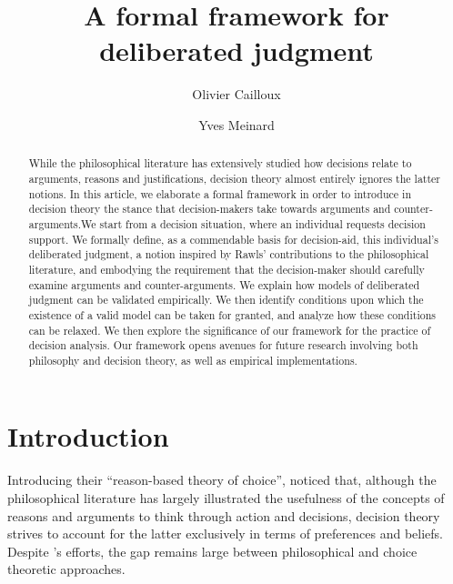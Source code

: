 \documentclass[smallextended,nospthms, natbib]{svjour3}
\begin{document}
\title{A formal framework for deliberated judgment}
\author{Olivier Cailloux \and Yves Meinard}
\makeatletter
\makeatother
\maketitle


\begin{abstract}
While the philosophical literature has extensively studied how decisions relate to arguments, reasons and justifications, decision theory almost entirely ignores the latter notions.
In this article, we elaborate a formal framework in order to introduce in decision theory the stance that decision-makers take towards arguments and counter-arguments.We start from a decision situation, where an individual requests decision support. We formally define, as a commendable basis for decision-aid, this individual’s deliberated judgment, a notion inspired by Rawls' contributions to the philosophical literature, and embodying the requirement that the decision-maker should carefully examine arguments and counter-arguments.  
We explain how models of deliberated judgment can be validated empirically.
We then identify conditions upon which the existence of a valid model can be taken for granted, and analyze how these conditions can be relaxed.
We then explore the significance of our framework for the practice of decision analysis.
Our framework opens avenues for future research involving both philosophy and decision theory, as well as empirical implementations. 
\end{abstract}

\section{Introduction}
\label{sec:intro}

Introducing their “reason-based theory of choice”, \citet{dietrich_reason-based_2013} noticed that, although the philosophical literature has largely illustrated the usefulness of the concepts of reasons and arguments to think through action and decisions, decision theory strives to account for the latter exclusively in terms of preferences and beliefs. Despite \citeauthor{dietrich_reason-based_2013}’s \citeyearpar{dietrich_reason-based_2013, dietrich_reason-based_2016} efforts, the gap remains large between philosophical and choice theoretic approaches.
\end{document}
